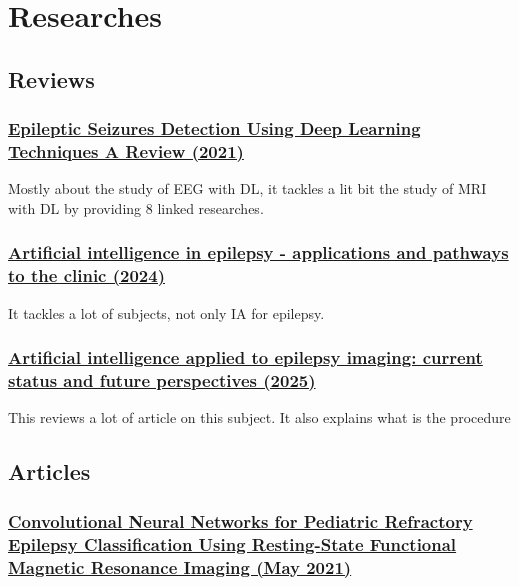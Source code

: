 \chapter{Researches}

\section{Reviews}

\subsection{\href{https://www.mdpi.com/1660-4601/18/11/5780\#B141-ijerph-18-05780}{Epileptic Seizures Detection Using Deep Learning Techniques A Review (2021)}}

Mostly about the study of EEG with DL, it tackles a lit bit the study of MRI with DL by providing 8 linked researches.

\subsection{\href{https://www.nature.com/articles/s41582-024-00965-9}{Artificial intelligence in epilepsy - applications and pathways to the clinic (2024)}}

It tackles a lot of subjects, not only IA for epilepsy.

\subsection{\href{https://www.sciencedirect.com/science/article/pii/S0035378725004874}{Artificial intelligence applied to epilepsy imaging: current status and future perspectives (2025)}}

This reviews a lot of article on this subject.
It also explains what is the procedure

\section{Articles}

\subsection{\href{https://www.sciencedirect.com/science/article/pii/S187887502032698X\#abssec0015}{Convolutional Neural Networks for Pediatric Refractory Epilepsy Classification Using Resting-State Functional Magnetic Resonance Imaging (May 2021)}}
\label{sub:sec:cnn}

